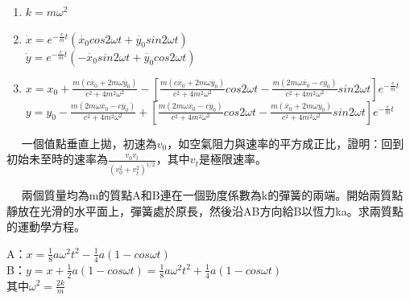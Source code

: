 \documentclass[cn,10pt,math=newtx,chinesefont=founder]{../elegantbook}
\begin{document}
\begin{solution}
\begin{enumerate}[label=(\arabic*)]
\item $k = m\omega^2$
\item $\Dot{x} = e^{-\frac{c}{m}t}(\Dot{x_0}cos2\omega t + \Dot{y_0}sin2\omega t)$\\
$\Dot{y} = e^{-\frac{c}{m}t}(-\Dot{x_0}sin2\omega t + \Dot{y_0}cos2\omega t)$
\item $x = x_0 + \frac{m(c\Dot{x_0}+2m\omega \Dot{y_0})}{c^2+4m^2\omega^2} - \left[ \frac{m(c\Dot{x_0}+2m\omega \Dot{y_0})}{c^2+4m^2\omega^2}cos2\omega t - \frac{m(2m\omega \Dot{x_0} - c\Dot{y_0})}{c^2+4m^2\omega^2}sin2\omega t \right] e^{-\frac{c}{m}t}$ \\
$y = y_0 - \frac{m(2m\omega \Dot{x_0} - c \Dot{y_0})}{c^2+4m^2\omega^2} + \left[ \frac{m(2m\omega \Dot{x_0} - c \Dot{y_0})}{c^2+4m^2\omega^2}cos2\omega t - \frac{m(\Dot{x_0} + 2m\omega\Dot{y_0})}{c^2+4m^2\omega^2}sin2\omega t \right] e^{-\frac{c}{m}t}$
\end{enumerate}
\end{solution}

\newpage


\begin{example}　
    一個值點垂直上拋，初速為$v_0$，如空氣阻力與速率的平方成正比，證明：回到初始未至時的速率為$\frac{v_0v_t}{(v_0^2+v_t^2)^{1/2}}$，其中$v_t$是極限速率。
    
    \rightline{[2.1.32]}
    
\end{example}

\begin{solution}

\end{solution}

\newpage


\begin{example}　
    兩個質量均為m的質點A和B連在一個勁度係數為k的彈簧的兩端。開始兩質點靜放在光滑的水平面上，彈簧處於原長，然後沿AB方向給B以恆力ka。求兩質點的運動學方程。
    
    \rightline{[2.1.33]}
    
\end{example}

\begin{solution}
A：$x = \frac{1}{8}a\omega^2t^2 - \frac{1}{4}a(1-cos\omega t)$\\
B：$y = x + \frac{1}{2}a(1-cos\omega t) = \frac{1}{8}a\omega^2t^2 + \frac{1}{4}a(1-cos\omega t)$\\
其中$\omega^2 = \frac{2k}{m}$
\end{solution}

\newpage
\end{document}
